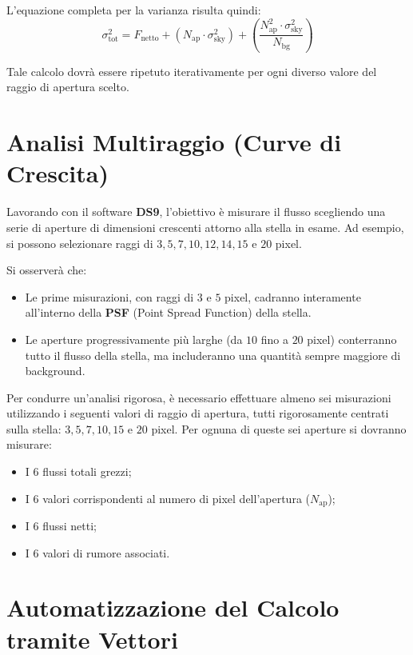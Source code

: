L'equazione completa per la varianza risulta quindi:
\begin{equation}
\sigma_{\text{tot}}^2 = F_{\text{netto}} + \left( N_{\text{ap}} \cdot \sigma_{\text{sky}}^2 \right) + \left( \frac{N_{\text{ap}}^2 \cdot \sigma_{\text{sky}}^2}{N_{\text{bg}}} \right)
\end{equation}

Tale calcolo dovrà essere ripetuto iterativamente per ogni diverso valore del raggio di apertura scelto.

\section{Analisi Multiraggio (Curve di Crescita)}

Lavorando con il software \textbf{DS9}, l'obiettivo è misurare il flusso scegliendo una serie di aperture di dimensioni crescenti attorno alla stella in esame. Ad esempio, si possono selezionare raggi di $3, 5, 7, 10, 12, 14, 15$ e $20$ pixel.

Si osserverà che:
\begin{itemize}
\item Le prime misurazioni, con raggi di $3$ e $5$ pixel, cadranno interamente all'interno della \textbf{PSF} (Point Spread Function) della stella.
\item Le aperture progressivamente più larghe (da $10$ fino a $20$ pixel) conterranno tutto il flusso della stella, ma includeranno una quantità sempre maggiore di background.
\end{itemize}

Per condurre un'analisi rigorosa, è necessario effettuare almeno sei misurazioni utilizzando i seguenti valori di raggio di apertura, tutti rigorosamente centrati sulla stella: $3, 5, 7, 10, 15$ e $20$ pixel.
Per ognuna di queste sei aperture si dovranno misurare:
\begin{itemize}
\item I 6 flussi totali grezzi;
\item I 6 valori corrispondenti al numero di pixel dell'apertura ($N_{\text{ap}}$);
\item I 6 flussi netti;
\item I 6 valori di rumore associati.
\end{itemize}

\section{Automatizzazione del Calcolo tramite Vettori}

